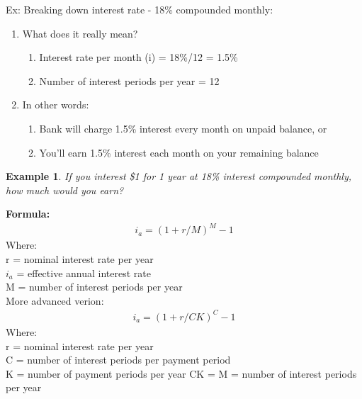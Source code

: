 \documentclass{report} %
\newtheorem{exmp}{Example}
\begin{document}
Ex: Breaking down interest rate - 18\% compounded monthly:
\begin{enumerate}
    \item What does it really mean?
    \begin{enumerate}
        \item Interest rate per month (i) = 18\%/12 = 1.5\%
        \item Number of interest periods per year = 12
    \end{enumerate}
    \item In other words:
    \begin{enumerate}
        \item Bank will charge 1.5\% interest every month on unpaid balance, or
        \item You'll earn 1.5\% interest each month on your remaining balance
    \end{enumerate}
\end{enumerate}

\begin{exmp}
    If you interest \$1 for 1 year at 18\% interest compounded monthly, how much would you earn?
\end{exmp}
\textbf{Formula:} 
\begin{equation*}
    \begin{aligned}
        i_a = (1+ r/M)^M - 1
    \end{aligned}
\end{equation*}
Where: \\ %
r = nominal interest rate per year \\
$i_a$ = effective annual interest rate \\
M = number of interest periods per year \\

\noindent
More advanced verion:
\begin{equation*}
    \begin{aligned}
        i_a = (1+ r/CK)^C - 1
    \end{aligned}
\end{equation*}
Where: \\ %
r = nominal interest rate per year \\
C = number of interest periods per payment period \\
K = number of payment periods per year
CK = M = number of interest periods per year \\
\end{document}
